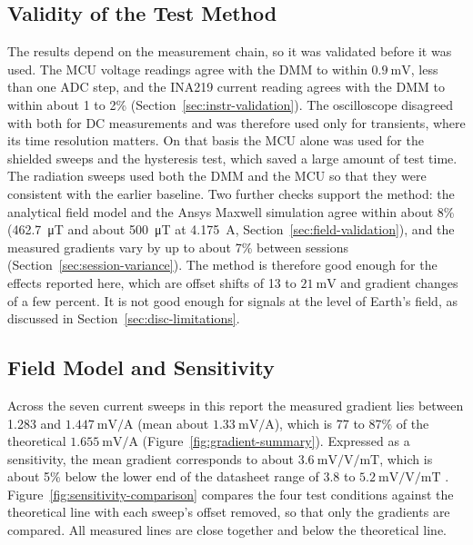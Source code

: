 \documentclass[12pt,a4paper]{article}
\begin{document}
\subsection{Validity of the Test Method}
\label{sec:disc-validity}

The results depend on the measurement chain, so it was validated before it was used. The MCU voltage readings agree with the DMM to within $\SI{0.9}{\milli\volt}$, less than one ADC step, and the INA219 current reading agrees with the DMM to within about 1 to 2\% (Section~\ref{sec:instr-validation}). The oscilloscope disagreed with both for DC measurements and was therefore used only for transients, where its time resolution matters. On that basis the MCU alone was used for the shielded sweeps and the hysteresis test, which saved a large amount of test time. The radiation sweeps used both the DMM and the MCU so that they were consistent with the earlier baseline. Two further checks support the method: the analytical field model and the Ansys Maxwell simulation agree within about 8\% (\SI{462.7}{\micro\tesla} and about \SI{500}{\micro\tesla} at \SI{4.175}{\ampere}, Section~\ref{sec:field-validation}), and the measured gradients vary by up to about 7\% between sessions (Section~\ref{sec:session-variance}). The method is therefore good enough for the effects reported here, which are offset shifts of 13 to $\SI{21}{\milli\volt}$ and gradient changes of a few percent. It is not good enough for signals at the level of Earth's field, as discussed in Section~\ref{sec:disc-limitations}.

\subsection{Field Model and Sensitivity}
\label{sec:disc-model}

Across the seven current sweeps in this report the measured gradient lies between 1.283 and $\SI{1.447}{\milli\volt\per\ampere}$ (mean about $\SI{1.33}{\milli\volt\per\ampere}$), which is 77 to 87\% of the theoretical $\SI{1.655}{\milli\volt\per\ampere}$ (Figure~\ref{fig:gradient-summary}). Expressed as a sensitivity, the mean gradient corresponds to about $\SI{3.6}{\milli\volt\per\volt\per\milli\tesla}$, which is about 5\% below the lower end of the datasheet range of 3.8 to $\SI{5.2}{\milli\volt\per\volt\per\milli\tesla}$ \cite{ct100_datasheet}. Figure~\ref{fig:sensitivity-comparison} compares the four test conditions against the theoretical line with each sweep's offset removed, so that only the gradients are compared. All measured lines are close together and below the theoretical line.
\end{document}
